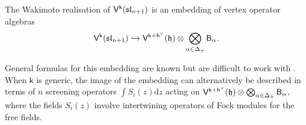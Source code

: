 \documentclass[10pt,a4paper]{amsart}
\numberwithin{equation}{section}
\newcommand{\dd}{\mathrm{d}}   %
\newcommand{\kk}{\mathsf{k}}   %
\DeclarePairedDelimiter{\brac}{\lparen}{\rparen}   %
\newcommand{\alg}[1]{\mathfrak{#1}}  %
\newcommand{\VOA}[1]{\mathsf{#1}}    %
\newcommand{\SLA}[2]{\alg{#1}_{#2}}                      %
\newcommand{\slnpone}{\SLA{sl}{n+1}}
\newcommand{\cartan}{\mathfrak{h}}
\newcommand{\cox}{\mathsf{h}}                                        %
\newcommand{\dcox}{\coroot{\cox}}                                    %
\newcommand{\proots}{\Delta_+}                                       %
\newcommand{\coroot}[1]{#1^{\vee}}                                   %
\newcommand{\uaffvoa}[2]{\VOA{V}^{#1}\brac{#2}}                   %
\newcommand{\bgvoa}{\VOA{B}}                                      %
\theoremstyle{plain}
\begin{document}
The Wakimoto realisation of $\uaffvoa{\kk}{\slnpone}$ is an embedding of vertex operator algebras 
%
\begin{equation}
    \uaffvoa{\kk}{\slnpone} \hookrightarrow \uaffvoa{\kk+\dcox}{\cartan} \otimes \bigotimes_{\alpha \in \proots} \bgvoa_\alpha.
\end{equation}

General formulas for this embedding are known but are difficult to work with \cite{Fre05Opers,Pet97Free,KuwaConf90}. When $\kk$ is generic, the image of the embedding can alternatively be described in terms of $n$ screening operators $\int S_i(z) \dd z$ acting on $\uaffvoa{\kk+\dcox}{\cartan} \otimes \bigotimes_{\alpha \in \proots} \bgvoa_\alpha$, where the fields $S_i(z)$ involve intertwining operators of Fock modules for the free fields. 
\end{document}
